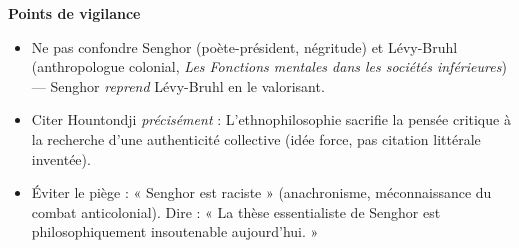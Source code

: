 \documentclass[11pt]{article}
\begin{document}
\begin{corrige}
\textbf{Points de vigilance}\par
\begin{itemize}
\item Ne pas confondre Senghor (poète-président, négritude) et Lévy-Bruhl (anthropologue colonial, \emph{Les Fonctions mentales dans les sociétés inférieures}) — Senghor \emph{reprend} Lévy-Bruhl en le valorisant.
\item Citer Hountondji \emph{précisément} : \guillemotleft L'ethnophilosophie sacrifie la pensée critique à la recherche d'une authenticité collective \guillemotright (idée force, pas citation littérale inventée).
\item Éviter le piège : « Senghor est raciste » (anachronisme, méconnaissance du combat anticolonial). Dire : « La thèse essentialiste de Senghor est philosophiquement insoutenable aujourd'hui. »
\end{itemize}
\end{corrige}
\end{document}

